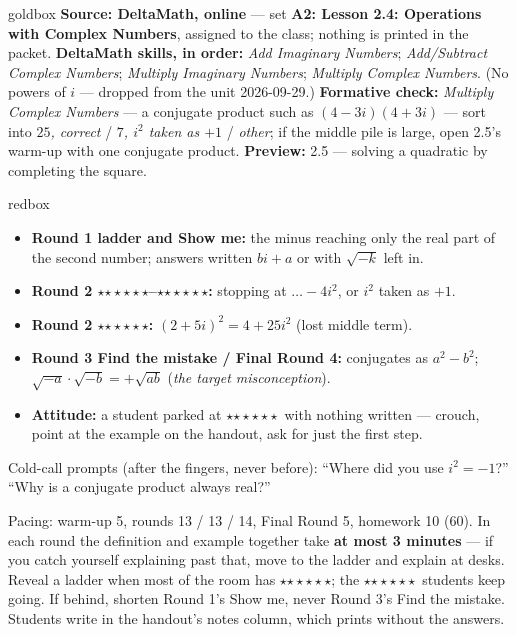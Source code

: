 \documentclass[10pt]{article}
\newcommand{\rung}[1]{{\color{goldacc}\ifcase#1\or$\star$\or$\star\star$\or$\star\star\star$\fi}}
\begin{document}
\boxguard
\begin{skillbox}{goldbox}
\textbf{Source: DeltaMath, online} --- set \textbf{A2: Lesson 2.4: Operations with Complex
Numbers}, assigned to the class; nothing is printed in the packet. \textbf{DeltaMath skills, in
order:} \emph{Add Imaginary Numbers}; \emph{Add/Subtract Complex Numbers}; \emph{Multiply
Imaginary Numbers}; \emph{Multiply Complex Numbers}. (No powers of $i$ --- dropped from the unit
2026-09-29.) \textbf{Formative check:} \emph{Multiply Complex Numbers} --- a conjugate product
such as $(4-3i)(4+3i)$ --- sort into \emph{$25$, correct} / \emph{$7$, $i^2$ taken as $+1$} /
\emph{other}; if the middle pile is large, open 2.5's warm-up with one conjugate product.
\textbf{Preview:} 2.5 --- solving a quadratic by completing the square.
\end{skillbox}

\boxguard
\begin{skillbox}{redbox}
\begin{itemize}[leftmargin=1.2em, nosep]
  \item \textbf{Round 1 ladder and Show me:} the minus reaching only the real part of the
        second number; answers written $bi+a$ or with $\sqrt{-k}$ left in.
  \item \textbf{Round 2 \rung1--\rung2:} stopping at $\ldots-4i^2$, or $i^2$ taken as $+1$.
  \item \textbf{Round 2 \rung3:} $(2+5i)^2=4+25i^2$ (lost middle term).
  \item \textbf{Round 3 Find the mistake / Final Round 4:} conjugates as $a^2-b^2$;
        $\sqrt{-a}\cdot\sqrt{-b}=+\sqrt{ab}$ (\emph{the target misconception}).
  \item \textbf{Attitude:} a student parked at \rung1\ with nothing written --- crouch, point at
        the example on the handout, ask for just the first step.
\end{itemize}
Cold-call prompts (after the fingers, never before): ``Where did you use $i^2=-1$?'' \;
``Why is a conjugate product always real?''
\end{skillbox}

\begin{teachernote}[Slides]
Pacing: warm-up 5, rounds 13 / 13 / 14, Final Round 5, homework 10 (60). In each round the
definition and example together take \textbf{at most 3 minutes} --- if you catch yourself
explaining past that, move to the ladder and explain at desks. Reveal a ladder when most of the
room has \rung2; the \rung3\ students keep going. If behind, shorten Round 1's Show me, never
Round 3's Find the mistake. Students write in the handout's notes column, which prints without
the answers.
\end{teachernote}
\end{document}
